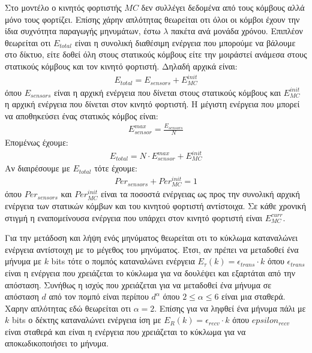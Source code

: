 Στο μοντέλο ο κινητός φορτιστής $MC$ δεν συλλέγει δεδομένα από τους κόμβους αλλά μόνο τους φορτίζει. Επίσης χάρην απλότητας θεωρείται οτι όλοι οι
κόμβοι έχουν την ίδια συχνότητα παραγωγής μηνυμάτων, έστω $\lambda$ πακέτα ανά μονάδα χρόνου. Επιπλέον θεωρείται οτι $E_{total}$ είναι η συνολική διαθέσιμη ενέργεια
που μπορούμε να βάλουμε στο δίκτυο, είτε δοθεί όλη στους στατικούς κόμβους είτε την μοιράστεί ανάμεσα στους στατικούς κόμβους και τον κινητό φορτιστή. Δηλαδή
αρχικά είναι:
\begin{align}
\label{total}
E_{total} = E_{sensors} + E_{MC}^{init}
\end{align}
όπου $E_{sensors}$ είναι η αρχική ενέργεια που δίνεται στους στατικούς κόμβους και $E_{MC}^{init}$ η αρχική ενέργεια που δίνεται στον κινητό φορτιστή. Η μέγιστη
ενέργεια που μπορεί να αποθηκεύσει ένας στατικός κόμβος είναι:
\begin{align*}
E^{max}_{sensor} = \frac{E_{sensors}}{N}
\end{align*}
Επομένως έχουμε:
\begin{align*}
E_{total} = N \cdot E^{max}_{sensor} + E_{MC}^{init}
\end{align*}
Αν διαιρέσουμε με $E_{total}$ τότε έχουμε:
\begin{align*}
Per_{sensors} + Per_{MC}^{init} = 1
\end{align*}
όπου $Per_{sensors}$ και $Per_{MC}^{init}$ είναι τα ποσοστά ενέργειας ως προς την συνολική αρχική ενέργεια των στατικών κόμβων και του κινητού φορτιστή αντίστοιχα.
Σε κάθε χρονική στιγμή η εναπομείνουσα ενέργεια που υπάρχει στον κινητό φορτιστή είναι $E^{curr}_{MC}$.

Για την μετάδοση και λήψη ενός μηνύματος θεωρείται οτι το κύκλωμα καταναλώνει ενέργεια αντίστοιχη με το μέγεθος του μηνύματος. Έτσι, αν πρέπει να μεταδοθεί ένα
μήνυμα με $k$ bits τότε ο πομπός καταναλώνει ενέργεια $E_{\tau}(k) = \epsilon_{trans}\cdot k$ όπου $\epsilon_{trans}$ είναι η ενέργεια που
χρειάζεται το κύκλωμα για να δουλέψει και εξαρτάται από την απόσταση. Συνήθως η ισχύς που χρειάζεται για να μεταδοθεί ένα μήνυμα σε απόσταση $d$ από τον πομπό είναι
περίπου $d^{\alpha}$ όπου $2\leq\alpha\leq6$ είναι μια σταθερά. Χαρην απλότητας εδώ θεωρείται οτι $\alpha = 2$. Επίσης για να ληφθεί ένα μήνυμα πάλι με $k$ bits ο
δέκτης καταναλώνει ενέργεια ίση με $E_{R}(k) = \epsilon_{recv}\cdot k$ όπου $epsilon_{recv}$ είναι σταθερά και είναι η ενέργεια που χρειάζεται το κύκλωμα για να
αποκωδικοποιήσει το μήνυμα.

